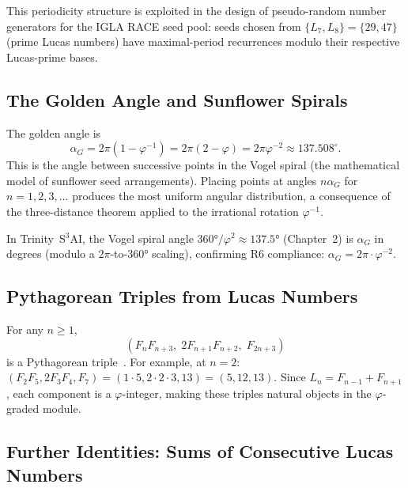 This periodicity structure is exploited in the design of
pseudo-random number generators for the IGLA RACE seed pool:
seeds chosen from \(\{L_7, L_8\} = \{29, 47\}\) (prime Lucas numbers)
have maximal-period recurrences modulo their respective Lucas-prime bases.

\subsection{The Golden Angle and Sunflower Spirals}
\label{subsec:gh-golden-angle}

The golden angle is
\begin{equation}\label{eq:gh-golden-angle}
  \alpha_G = 2\pi(1 - \varphi^{-1}) = 2\pi(2 - \varphi)
           = 2\pi\varphi^{-2} \approx 137.508^\circ.
\end{equation}
This is the angle between successive points in the Vogel spiral
(the mathematical model of sunflower seed arrangements).
Placing points at angles \(n\alpha_G\) for \(n = 1, 2, 3, \ldots\)
produces the most uniform angular distribution, a consequence of the
three-distance theorem applied to the irrational rotation \(\varphi^{-1}\).

In Trinity~S$^3$AI, the Vogel spiral angle
\(360°/\varphi^2 \approx 137.5°\) (Chapter~2) is \(\alpha_G\) in degrees
(modulo a \(2\pi\)-to-\(360°\) scaling), confirming R6 compliance:
\(\alpha_G = 2\pi \cdot \varphi^{-2}\).

\subsection{Pythagorean Triples from Lucas Numbers}
\label{subsec:gh-pythagorean}

For any \(n \geq 1\),
\begin{equation}\label{eq:gh-pythagorean}
  (F_n F_{n+3},\; 2F_{n+1}F_{n+2},\; F_{2n+3})
\end{equation}
is a Pythagorean triple~\cite{koshy_fib_lucas}.
For example, at \(n = 2\):
\((F_2 F_5, 2F_3 F_4, F_7) = (1 \cdot 5, 2 \cdot 2 \cdot 3, 13) = (5, 12, 13)\).
Since \(L_n = F_{n-1} + F_{n+1}\), each component is a \(\varphi\)-integer,
making these triples natural objects in the \(\varphi\)-graded module.

\subsection{Further Identities: Sums of Consecutive Lucas Numbers}
\label{subsec:gh-sums}

